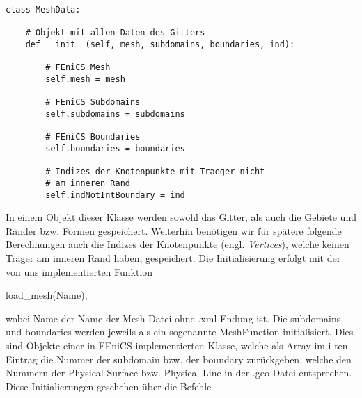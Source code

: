 \begin{lstlisting}
class MeshData:

    # Objekt mit allen Daten des Gitters
    def __init__(self, mesh, subdomains, boundaries, ind):

        # FEniCS Mesh
        self.mesh = mesh

        # FEniCS Subdomains
        self.subdomains = subdomains

        # FEniCS Boundaries
        self.boundaries = boundaries

        # Indizes der Knotenpunkte mit Traeger nicht 
        # am inneren Rand
        self.indNotIntBoundary = ind
\end{lstlisting}

In einem Objekt dieser Klasse werden sowohl das Gitter, als auch die Gebiete und Ränder bzw. Formen gespeichert. Weiterhin benötigen wir für spätere folgende Berechnungen auch die Indizes der Knotenpunkte (engl. \textit{Vertices}), welche keinen Träger am inneren Rand haben, gespeichert. Die Initialisierung erfolgt mit der von uns implementierten Funktion 
\begin{center}
\textsf{load\_mesh(Name)},
\end{center} wobei \textsf{Name} der Name der Mesh-Datei ohne \textsf{.xml}-Endung ist. Die \textsf{subdomains} und \textsf{boundaries} werden jeweils als ein sogenannte \textsf{MeshFunction} initialisiert. Dies sind Objekte einer in FEniCS implementierten Klasse, welche als Array im \textsf{i}-ten Eintrag die Nummer der \textsf{subdomain} bzw. der \textsf{boundary} zurückgeben, welche den Nummern der \textsf{Physical Surface} bzw. \textsf
{Physical Line}  in der \textsf{.geo}-Datei entsprechen. Diese Initialierungen geschehen über die Befehle

